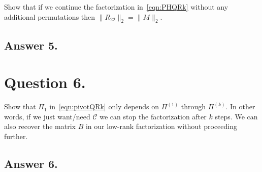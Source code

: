 \documentclass[12pt]{article}
\newcommand{\C}{\mathcal{C}}
\begin{document}
Show that if we continue the factorization in~\cref{eqn:PHQRk} without any additional permutations then $\|R_{22}\|_2 = \|M\|_2.$

\subsection*{Answer 5.}

\section*{Question 6.}
Show that $\Pi_1$ in~\cref{eqn:pivotQRk} only depends on $\Pi^{(1)}$ through $\Pi^{(k)}.$ In other words, if we just want/need $\C$ we can stop the factorization after $k$ steps. We can also recover the matrix $B$ in our low-rank factorization without proceeding further.

\subsection*{Answer 6.}
\end{document}
